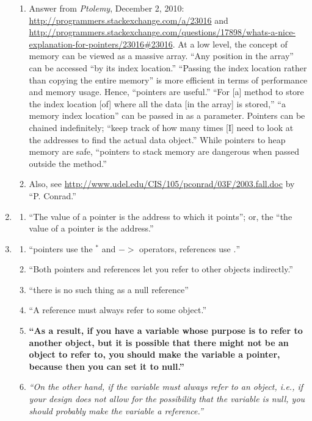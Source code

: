 \begin{enumerate}
\begin{enumerate}
	\item Answer from {\it Ptolemy}, December 2, 2010: \url{http://programmers.stackexchange.com/a/23016} and \url{http://programmers.stackexchange.com/questions/17898/whats-a-nice-explanation-for-pointers/23016#23016}. At a low level, the concept of memory can be viewed as a massive array. ``Any position in the array'' can be accessed ``by its index location.'' ``Passing the index location rather than copying the entire memory'' is more efficient in terms of performance and memory usage. Hence, ``pointers are useful.'' ``For [a] method to store the index location [of] where all the data [in the array] is stored,'' ``a memory index location'' can be passed in as a parameter. Pointers can be chained indefinitely; ``keep track of how many times [I] need to look at the addresses to find the actual data object.'' While pointers to heap memory are safe, ``pointers to stack memory are dangerous when passed outside the method.''
	\item Also, see \url{http://www.udel.edu/CIS/105/pconrad/03F/2003.fall.doc} by ``P. Conrad.''
	\end{enumerate}
\item \cite[pp. 15, second last paragraph]{Jensen2003} \vspace{-0.3cm}
	\begin{enumerate} \itemsep -2pt
	\item ``The value of a pointer is the address to which it points''; or, the ``the value of a pointer is the address.''
	\end{enumerate}
\item \cite{EliteHussar2010} \vspace{-0.3cm}
	\begin{enumerate} \itemsep -2pt
	\item ``pointers use the $^{\ast}$ and $->$ operators, references use $.$''
	\item ``Both pointers and references let you refer to other objects indirectly.''
	\item ``there is no such thing as a null reference''
	\item ``A reference must always refer to some object.''
	\item {\bf ``As a result, if you have a variable whose purpose is to refer to another object, but it is possible that there might not be an object to refer to, you should make the variable a pointer, because then you can set it to null.''}
	\item {\it ``On the other hand, if the variable must always refer to an object, i.e., if your design does not allow for the possibility that the variable is null, you should probably make the variable a reference.''}

\end{enumerate}
\end{enumerate}
